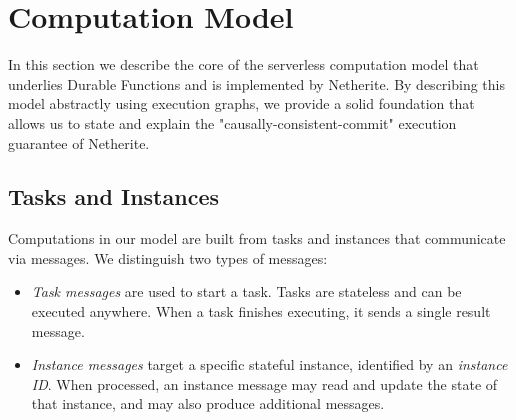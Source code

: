 \section{Computation Model}
\label{sec:model}

In this section we describe the core of the serverless computation model that underlies Durable Functions and is implemented by Netherite. By describing this model abstractly using execution graphs, we provide a solid foundation that allows us to state and explain the "causally-consistent-commit" execution guarantee of Netherite. 





\subsection{Tasks and Instances}\label{sec:tasksandinstances}

Computations in our model are built from tasks and instances that communicate via messages. We distinguish two types of messages:
\begin{itemize}
    \item \emph{Task messages} are used to start a task. Tasks are stateless and can be executed anywhere. When a task finishes executing, it sends a single result message.
    \item \emph{Instance messages} target a specific stateful instance, identified by an \emph{instance ID}. When processed, an instance message may read and update the state of that instance, and may also produce additional messages.
\end{itemize}

